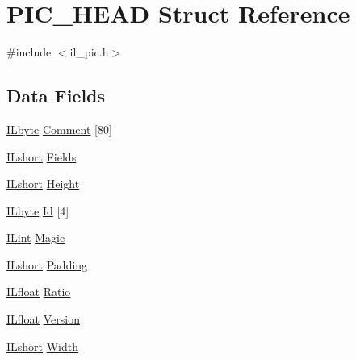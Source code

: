 \hypertarget{struct_p_i_c___h_e_a_d}{\section{P\-I\-C\-\_\-\-H\-E\-A\-D Struct Reference}
\label{struct_p_i_c___h_e_a_d}
}


{\ttfamily \#include $<$il\-\_\-pic.\-h$>$}

\subsection*{Data Fields}
\begin{DoxyCompactItemize}
\item 
\hyperlink{il_8h_a88e562dacd22f4efcf6f9d31b85d4f92}{I\-Lbyte} \hyperlink{struct_p_i_c___h_e_a_d_a1edc1910ce5d3e55934c1bbb9af6325b}{Comment} \mbox{[}80\mbox{]}
\item 
\hyperlink{il_8h_afc75ded918970afe7517d3f7f0561db3}{I\-Lshort} \hyperlink{struct_p_i_c___h_e_a_d_a9c4c12d33e3bfe8cf25a5da42dc4432d}{Fields}
\item 
\hyperlink{il_8h_afc75ded918970afe7517d3f7f0561db3}{I\-Lshort} \hyperlink{struct_p_i_c___h_e_a_d_a832cfdf20972fbb1d04a519f4ec7b7db}{Height}
\item 
\hyperlink{il_8h_a88e562dacd22f4efcf6f9d31b85d4f92}{I\-Lbyte} \hyperlink{struct_p_i_c___h_e_a_d_a04ac215b56778d024dbea3b9f4f02a62}{Id} \mbox{[}4\mbox{]}
\item 
\hyperlink{il_8h_a288a97fb9e92e707a60b749d0039fafe}{I\-Lint} \hyperlink{struct_p_i_c___h_e_a_d_a3a8c8a78c9217c687d8608db1b275d8f}{Magic}
\item 
\hyperlink{il_8h_afc75ded918970afe7517d3f7f0561db3}{I\-Lshort} \hyperlink{struct_p_i_c___h_e_a_d_a4f03a049ffb5f8264fbb3ea7ee6e8391}{Padding}
\item 
\hyperlink{il_8h_a0576415379485bafa4b5f61989797b5e}{I\-Lfloat} \hyperlink{struct_p_i_c___h_e_a_d_a33a8ad3f43a15b638954179693468586}{Ratio}
\item 
\hyperlink{il_8h_a0576415379485bafa4b5f61989797b5e}{I\-Lfloat} \hyperlink{struct_p_i_c___h_e_a_d_aa3cda4c53cc7e613a2f381ac3d840e9c}{Version}
\item 
\hyperlink{il_8h_afc75ded918970afe7517d3f7f0561db3}{I\-Lshort} \hyperlink{struct_p_i_c___h_e_a_d_a9a723d073c876e5a251603e80ee9a5d3}{Width}
\end{DoxyCompactItemize}


